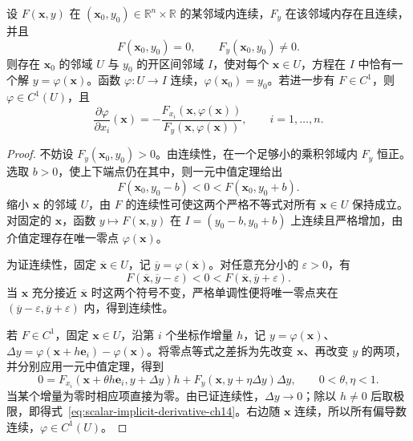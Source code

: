 \documentclass[UTF8,12pt,a4paper,fontset=fandol]{ctexbook}
\begin{document}
\begin{theorem}[单个方程的隐函数存在定理]
\label{thm:scalar-implicit-function-ch14}
设 $F(\boldsymbol x,y)$ 在 $(\boldsymbol x_0,y_0)\in\mathbb R^n\times\mathbb R$ 的某邻域内连续，$F_y$ 在该邻域内存在且连续，并且
\[
    F(\boldsymbol x_0,y_0)=0,\qquad F_y(\boldsymbol x_0,y_0)\ne0.
\]
则存在 $\boldsymbol x_0$ 的邻域 $U$ 与 $y_0$ 的开区间邻域 $I$，使对每个 $\boldsymbol x\in U$，方程在 $I$ 中恰有一个解 $y=\varphi(\boldsymbol x)$。函数 $\varphi:U\to I$ 连续，$\varphi(\boldsymbol x_0)=y_0$。若进一步有 $F\in C^1$，则 $\varphi\in C^1(U)$，且
\begin{equation}
\label{eq:scalar-implicit-derivative-ch14}
    \frac{\partial\varphi}{\partial x_i}(\boldsymbol x)
    =-\frac{F_{x_i}(\boldsymbol x,\varphi(\boldsymbol x))}
             {F_y(\boldsymbol x,\varphi(\boldsymbol x))},
    \qquad i=1,\ldots,n.
\end{equation}
\end{theorem}
\begin{proof}
不妨设 $F_y(\boldsymbol x_0,y_0)>0$。由连续性，在一个足够小的乘积邻域内 $F_y$ 恒正。选取 $b>0$，使上下端点仍在其中，则一元中值定理给出
\[
    F(\boldsymbol x_0,y_0-b)<0<F(\boldsymbol x_0,y_0+b).
\]
缩小 $\boldsymbol x$ 的邻域 $U$，由 $F$ 的连续性可使这两个严格不等式对所有 $\boldsymbol x\in U$ 保持成立。对固定的 $\boldsymbol x$，函数 $y\mapsto F(\boldsymbol x,y)$ 在 $I=(y_0-b,y_0+b)$ 上连续且严格增加，由介值定理存在唯一零点 $\varphi(\boldsymbol x)$。

为证连续性，固定 $\overline{\boldsymbol x}\in U$，记 $\overline y=\varphi(\overline{\boldsymbol x})$。对任意充分小的 $\varepsilon>0$，有
\[
    F(\overline{\boldsymbol x},\overline y-\varepsilon)<0
       <F(\overline{\boldsymbol x},\overline y+\varepsilon).
\]
当 $\boldsymbol x$ 充分接近 $\overline{\boldsymbol x}$ 时这两个符号不变，严格单调性便将唯一零点夹在 $(\overline y-\varepsilon,\overline y+\varepsilon)$ 内，得到连续性。

若 $F\in C^1$，固定 $\boldsymbol x\in U$，沿第 $i$ 个坐标作增量 $h$，记 $y=\varphi(\boldsymbol x)$、$\Delta y=\varphi(\boldsymbol x+h\boldsymbol e_i)-\varphi(\boldsymbol x)$。将零点等式之差拆为先改变 $\boldsymbol x$、再改变 $y$ 的两项，并分别应用一元中值定理，得到
\[
    0=F_{x_i}(\boldsymbol x+\theta h\boldsymbol e_i,y+\Delta y)h
       +F_y(\boldsymbol x,y+\eta\Delta y)\Delta y,
       \qquad 0<\theta,\eta<1.
\]
当某个增量为零时相应项直接为零。由已证连续性，$\Delta y\to0$；除以 $h\ne0$ 后取极限，即得式~\eqref{eq:scalar-implicit-derivative-ch14}。右边随 $\boldsymbol x$ 连续，所以所有偏导数连续，$\varphi\in C^1(U)$。
\end{proof}
\end{document}
